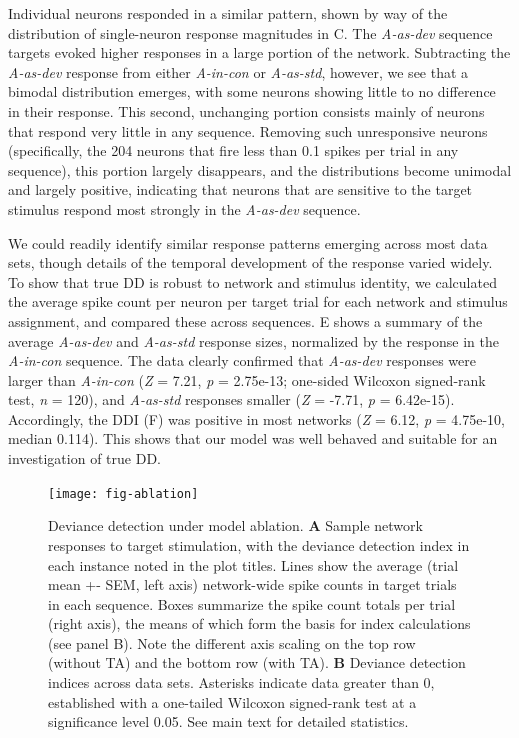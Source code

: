 \documentclass[9pt,lineno,onehalfspacing]{elife}
\newcommand{\dev}{\textit{A-as-dev}}
\newcommand{\msc}{\textit{A-in-con}}
\newcommand{\std}{\textit{A-as-std}}
\begin{document}
Individual neurons responded in a similar pattern, shown by way of the distribution of single-neuron response magnitudes in C. The \dev{} sequence targets evoked higher responses in a large portion of the network. Subtracting the \dev{} response from either \msc{} or \std{}, however, we see that a bimodal distribution emerges, with some neurons showing little to no difference in their response. This second, unchanging portion consists mainly of neurons that respond very little in any sequence. Removing such unresponsive neurons (specifically, the 204 neurons that fire less than 0.1 spikes per trial in any sequence), this portion largely disappears, and the distributions become unimodal and largely positive, indicating that neurons that are sensitive to the target stimulus respond most strongly in the \dev{} sequence.

We could readily identify similar response patterns emerging across most data sets, though details of the temporal development of the response varied widely. To show that true DD is robust to network and stimulus identity, we calculated the average spike count per neuron per target trial for each network and stimulus assignment, and compared these across sequences. E shows a summary of the average \dev{} and \std{} response sizes, normalized by the response in the \msc{} sequence. The data clearly confirmed that \dev{} responses were larger than \msc{} (\textit{Z} = 7.21, \textit{p} = 2.75e-13; one-sided Wilcoxon signed-rank test, \textit{n} = 120), and \std{} responses smaller (\textit{Z} = -7.71, \textit{p} = 6.42e-15). Accordingly, the DDI (F) was positive in most networks (\textit{Z} = 6.12, \textit{p} = 4.75e-10, median 0.114). This shows that our model was well behaved and suitable for an investigation of true DD.

\begin{figure}
    \texttt{[image: fig-ablation]}
    \caption{%
        Deviance detection under model ablation.
        \textbf{A} Sample network responses to target stimulation, with the deviance detection index in each instance noted in the plot titles. Lines show the average (trial mean +- SEM, left axis) network-wide spike counts in target trials in each sequence. Boxes summarize the spike count totals per trial (right axis), the means of which form the basis for index calculations (see panel B). Note the different axis scaling on the top row (without TA) and the bottom row (with TA).
        \textbf{B} Deviance detection indices across data sets. Asterisks indicate data greater than 0, established with a one-tailed Wilcoxon signed-rank test at a significance level 0.05. See main text for detailed statistics.
    }
    \label{fig:ablation}
\end{figure}
\end{document}
